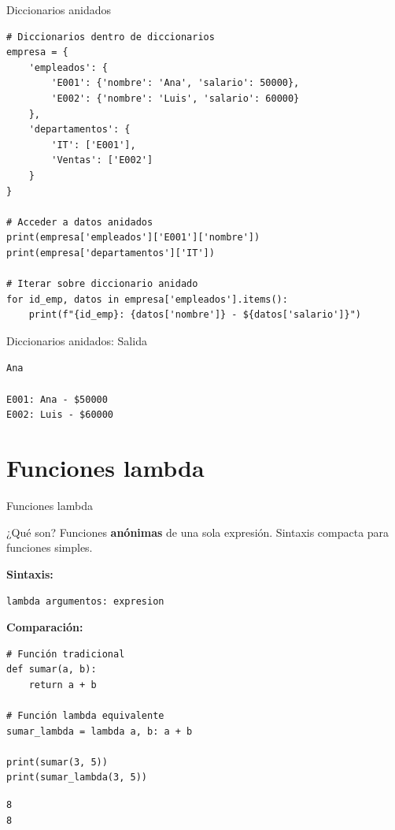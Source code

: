 \documentclass{beamer}
\begin{document}
\begin{frame}[fragile]{Diccionarios anidados \faLayerGroup}
\begin{lstlisting}
# Diccionarios dentro de diccionarios
empresa = {
    'empleados': {
        'E001': {'nombre': 'Ana', 'salario': 50000},
        'E002': {'nombre': 'Luis', 'salario': 60000}
    },
    'departamentos': {
        'IT': ['E001'],
        'Ventas': ['E002']
    }
}

# Acceder a datos anidados
print(empresa['empleados']['E001']['nombre'])
print(empresa['departamentos']['IT'])

# Iterar sobre diccionario anidado
for id_emp, datos in empresa['empleados'].items():
    print(f"{id_emp}: {datos['nombre']} - ${datos['salario']}")
\end{lstlisting}
\end{frame}

\begin{frame}[fragile]{Diccionarios anidados: Salida \faArrowCircleRight}
\begin{tcolorbox}[colback=green!10,colframe=green,title={\small\faArrowCircleRight \ Salida},coltitle=fg0,left=3pt,right=3pt,top=3pt,bottom=3pt,boxsep=2pt]
\small\texttt{Ana\\
['E001']\\
E001: Ana - \$50000\\
E002: Luis - \$60000}
\end{tcolorbox}
\end{frame}

\section{Funciones lambda}

\begin{frame}[fragile]{Funciones lambda \faLightbulb}
\begin{conceptbox}{¿Qué son?}
Funciones \textbf{anónimas} de una sola expresión. Sintaxis compacta para funciones simples.
\end{conceptbox}

\textbf{Sintaxis:}
\begin{lstlisting}
lambda argumentos: expresion
\end{lstlisting}

\vspace{0.2cm}
\textbf{Comparación:}
\begin{lstlisting}
# Función tradicional
def sumar(a, b):
    return a + b

# Función lambda equivalente
sumar_lambda = lambda a, b: a + b

print(sumar(3, 5))
print(sumar_lambda(3, 5))
\end{lstlisting}

\vspace{-0.2cm}
\begin{tcolorbox}[colback=green!10,colframe=green,title={\small\faArrowCircleRight \ Salida},coltitle=fg0,left=3pt,right=3pt,top=2pt,bottom=2pt,boxsep=1pt]
\small\texttt{8\\
8}
\end{tcolorbox}
\end{frame}
\end{document}
